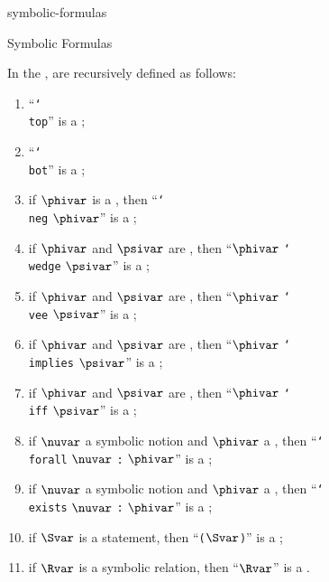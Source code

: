\documentclass{stex}
\begin{document}
\begin{smodule}{symbolic-formulas}
\begin{sfragment}[id=sec:symbolic-formulas]{Symbolic Formulas}
\begin{sparagraph}[style=symdoc]
    In the \texdialect,  are recursively defined as follows:
    \begin{enumerate}
      \item ``\texttt{\char`\\top}'' is a ;
      \item ``\texttt{\char`\\bot}'' is a ;
      \item if $\phivar$ is a ,
        then ``\texttt{\char`\\neg} $\phivar$'' is a ;
      \item if $\phivar$ and $\psivar$ are ,
        then ``$\phivar$ \texttt{\char`\\wedge} $\psivar$'' is a ;
      \item if $\phivar$ and $\psivar$ are ,
        then ``$\phivar$ \texttt{\char`\\vee} $\psivar$'' is a ;
      \item if $\phivar$ and $\psivar$ are ,
        then ``$\phivar$ \texttt{\char`\\implies} $\psivar$'' is a ;
      \item if $\phivar$ and $\psivar$ are ,
        then ``$\phivar$ \texttt{\char`\\iff} $\psivar$'' is a ;
      \item if $\nuvar$ a symbolic notion and $\phivar$ a ,
        then ``\texttt{\char`\\forall} $\nuvar$ \texttt: $\phivar$'' is a ;
      \item if $\nuvar$ a symbolic notion and $\phivar$ a ,
        then ``\texttt{\char`\\exists} $\nuvar$ \texttt: $\phivar$'' is a ;
      \item if $\Svar$ is a statement,
        then ``\texttt($\Svar$\texttt)'' is a ;
      \item if $\Rvar$ is a symbolic relation,
        then ``$\Rvar$'' is a .
    \end{enumerate}


\end{sparagraph}
\end{sfragment}
\end{smodule}
\end{document}
